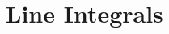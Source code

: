 \newpage

\section[Day 6: Line Integrals]{ Line Integrals }
























































